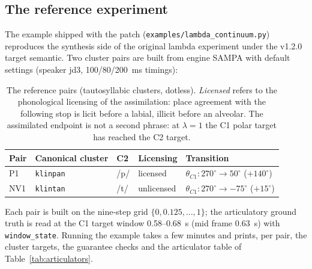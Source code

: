 \documentclass[11pt,a4paper]{article}
\newcommand{\lam}{\lambda}
\newcommand{\code}[1]{\texttt{#1}}
\begin{document}
\subsection{The reference experiment}

The example shipped with the patch
(\code{examples/lambda\_continuum.py}) reproduces the synthesis side
of the original lambda experiment under the v1.2.0 target semantic.
Two cluster pairs are built from engine SAMPA with default settings
(speaker jd3, 100/80/200~ms timings):

\begin{table}[t]
\centering\small
\caption{The reference pairs (tautosyllabic clusters, dotless).
\emph{Licensed} refers to the phonological licensing of the
assimilation: place agreement with the following stop is licit
before a labial, illicit before an alveolar.  The assimilated
endpoint is not a second phrase: at $\lam=1$ the C1 polar target
has reached the C2 target.}\label{tab:pairs}
\begin{tabularx}{\textwidth}{@{}l l l l X@{}}
\toprule
Pair & Canonical cluster & C2 & Licensing & Transition \\
\midrule
P1 & \code{klinpan} & /p/ & licensed &
$\theta_{C1}: 270^\circ \to 50^\circ$ ($+140^\circ$) \\
NV1 & \code{klintan} & /t/ & unlicensed &
$\theta_{C1}: 270^\circ \to -75^\circ$ ($+15^\circ$) \\
\bottomrule
\end{tabularx}
\end{table}

Each pair is built on the nine-step grid
$\{0, 0.125, \ldots, 1\}$; the articulatory ground truth is read at
the C1 target window 0.58--0.68~s (mid frame 0.63~s) with
\code{window\_state}.  Running the example takes a few minutes and
prints, per pair, the cluster targets, the guarantee checks and the
articulator table of Table~\ref{tab:articulators}.
\end{document}
